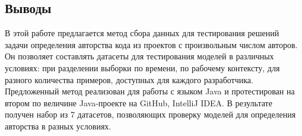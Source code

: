\subsection{Выводы}
В этой работе предлагается метод сбора данных для тестирования решений задачи определения авторства кода из проектов с произвольным числом авторов. Он позволяет составлять датасеты для тестирования моделей в различных условиях: при разделении выборки по времени, по рабочему контексту, для разного количества примеров, доступных для каждого разработчика. Предложенный метод реализован для работы с языком Java и протестирован на втором по величине Java-проекте на GitHub, IntelliJ IDEA. В результате получен набор из 7 датасетов, позволяющих проверку моделей для определения авторства в разных условиях.
